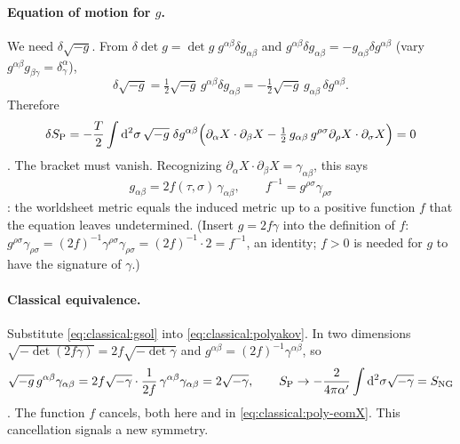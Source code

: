 \paragraph{Equation of motion for $g$.} We need $\delta\sqrt{-g}$. From
$\delta\det g=\det g\; g^{\alpha\beta}\delta g_{\alpha\beta}$ and
$g^{\alpha\beta}\delta g_{\alpha\beta}=-g_{\alpha\beta}\delta g^{\alpha\beta}$ (vary
$g^{\alpha\beta}g_{\beta\gamma}=\delta^\alpha_\gamma$),
\begin{equation}\label{eq:classical:varsqrtg}
  \delta\sqrt{-g}=\tfrac12\sqrt{-g}\,g^{\alpha\beta}\delta g_{\alpha\beta}
   =-\tfrac12\sqrt{-g}\,g_{\alpha\beta}\,\delta g^{\alpha\beta}.
\end{equation}
Therefore
\begin{equation}\label{eq:classical:varg}
  \delta S_{\rm P}=-\frac{T}{2}\int\mathrm{d}^2\sigma\,\sqrt{-g}\;\delta g^{\alpha\beta}
  \Big(\partial_\alpha X\cdot\partial_\beta X-\tfrac12\,g_{\alpha\beta}\,g^{\rho\sigma}\partial_\rho X\cdot\partial_\sigma X\Big)=0
\end{equation}
. The bracket must vanish. Recognizing
$\partial_\alpha X\cdot\partial_\beta X=\gamma_{\alpha\beta}$, this says
\begin{equation}\label{eq:classical:gsol}
  g_{\alpha\beta}=2f(\tau,\sigma)\,\gamma_{\alpha\beta},\qquad
  f^{-1}=g^{\rho\sigma}\gamma_{\rho\sigma}
\end{equation}
: the worldsheet metric equals the induced metric up to a
positive function $f$ that the equation leaves undetermined. (Insert
$g=2f\gamma$ into the definition of $f$: $g^{\rho\sigma}\gamma_{\rho\sigma}=(2f)^{-1}
\gamma^{\rho\sigma}\gamma_{\rho\sigma}=(2f)^{-1}\cdot2=f^{-1}$, an identity; $f>0$ is needed
for $g$ to have the signature of $\gamma$.)

\paragraph{Classical equivalence.} Substitute \eqref{eq:classical:gsol} into
\eqref{eq:classical:polyakov}. In two dimensions $\sqrt{-\det(2f\gamma)}=2f\sqrt{-\det\gamma}$
and $g^{\alpha\beta}=(2f)^{-1}\gamma^{\alpha\beta}$, so
\begin{equation}\label{eq:classical:equiv}
  \sqrt{-g}\,g^{\alpha\beta}\gamma_{\alpha\beta}
  =2f\sqrt{-\gamma}\cdot\frac{1}{2f}\,\gamma^{\alpha\beta}\gamma_{\alpha\beta}=2\sqrt{-\gamma},
  \qquad S_{\rm P}\to-\frac{2}{4\pi\alpha'}\int\mathrm{d}^2\sigma\sqrt{-\gamma}=S_{\rm NG}
\end{equation}
. The function $f$ cancels, both here and in
\eqref{eq:classical:poly-eomX}. This cancellation signals a new symmetry.

